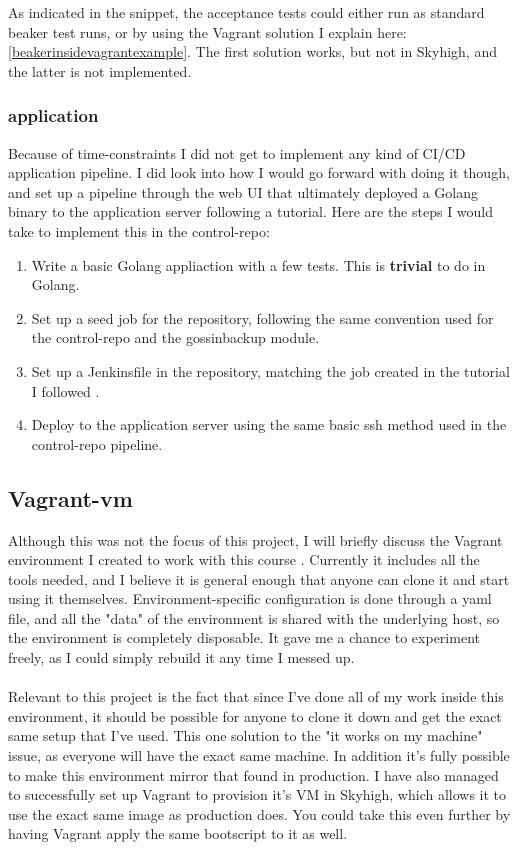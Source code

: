 As indicated in the snippet, the acceptance tests could either run as standard beaker test runs, or by using the Vagrant solution I explain here: \ref{beakerinsidevagrantexample}. The first solution works, but not in Skyhigh, and the latter is not implemented.

\subsubsection{application}

Because of time-constraints I did not get to implement any kind of CI/CD application pipeline. I did look into how I would go forward with doing it though, and set up a pipeline through the web UI that ultimately deployed a Golang binary to the application server following a tutorial\cite{buidonjenkinsandpublishwithpipelines}. Here are the steps I would take to implement this in the control-repo:

\begin{enumerate}
\item Write a basic Golang appliaction with a few tests. This is \textbf{trivial} to do in Golang.
\item Set up a seed job for the repository, following the same convention used for the control-repo and the gossinbackup module.
\item Set up a Jenkinsfile in the repository, matching the job created in the tutorial I followed \cite{buidonjenkinsandpublishwithpipelines}.
\item Deploy to the application server using the same basic ssh method used in the control-repo pipeline.
\end{enumerate}

\subsection{Vagrant-vm}

Although this was not the focus of this project, I will briefly discuss the Vagrant environment I created to work with this course \cite{tholok97vagrantvm}. Currently it includes all the tools needed, and I believe it is general enough that anyone can clone it and start using it themselves. Environment-specific configuration is done through a yaml file, and all the "data" of the environment is shared with the underlying host, so the environment is completely disposable. It gave me a chance to experiment freely, as I could simply rebuild it any time I messed up.
\\
\\
Relevant to this project is the fact that since I've done all of my work inside this environment, it should be possible for anyone to clone it down and get the exact same setup that I've used. This one solution to the "it works on my machine" issue, as everyone will have the exact same machine. In addition it's fully possible to make this environment mirror that found in production. I have also managed to successfully set up Vagrant to provision it's VM in Skyhigh, which allows it to use the exact same image as production does. You could take this even further by having Vagrant apply the same bootscript to it as well.



